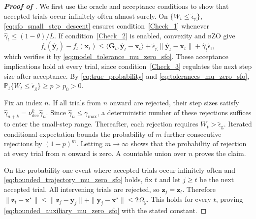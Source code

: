 \documentclass{article}
\begin{document}
\begin{proof}[\textbf{Proof of }]
\label{proof:gc_trajectory}
We first use the oracle and acceptance conditions to show that accepted
trials occur infinitely often almost surely. On
\(\{W_t\le\widetilde\epsilon_{\mathrm{g}}\}\),
\eqref{eq:sfo_small_step_descent} ensures condition~\eqref{Check_1} whenever
\(\hat\gamma_t\le(1-\theta)/L\). If condition~\eqref{Check_2} is
enabled, convexity and \textsc{bZO} give
\begin{equation}\label{eq:sfo_model_comparison}
f_t(\hat {\bm{y}}_t)-f_t(\bm{x}_t)
\le\langle\mathbf{G}_t,\hat {\bm{y}}_t-\bm{x}_t\rangle
+\widetilde\epsilon_{\mathrm{g}}\|\hat {\bm{y}}_t-\bm{x}_t\|
+\hat\gamma_t\widetilde\epsilon_{\mathrm{f}},
\end{equation}
which verifies it by \eqref{eq:model_tolerance_mu_zero_sfo}.
These acceptance implications hold at every trial,
since condition~\eqref{Check_3} regulates the next step size after
acceptance. By \eqref{eq:true_probability} and
\eqref{eq:tolerances_mu_zero_sfo},
\(\mathbb P_t\{W_t\le\widetilde\epsilon_{\mathrm{g}}\}\ge p>p_0>0\).

Fix an index \(n\). If all trials from \(n\) onward are rejected,
their step sizes satisfy
\(\hat\gamma_{n+k}=\nu_{\mathrm{dec}}^k\hat\gamma_n\).
Since \(\hat\gamma_n\le\gamma_{\max}\), a deterministic number of
these rejections suffices to enter the small-step range. Thereafter,
each rejection requires \(W_t>\widetilde\epsilon_{\mathrm{g}}\). Iterated
conditional expectation bounds the probability of \(m\) further
consecutive rejections by \((1-p)^m\). Letting \(m\to\infty\) shows
that the probability of rejection at every trial from \(n\) onward
is zero. A countable union over \(n\) proves the claim.

On the probability-one event where accepted trials occur infinitely
often and \eqref{eq:bounded_trajectory_mu_zero_sfo} holds, fix \(t\) and let
\(j\ge t\) be the next accepted trial. All intervening trials are
rejected, so \(\bm{z}_j=\bm{z}_t\). Therefore
\(\|\bm{z}_t-\bm{x}^\star\|\le\|\bm{z}_j-\bm{y}_j\|+\|\bm{y}_j-\bm{x}^\star\|
\le2\widehat\Omega_y\).
This holds for every \(t\), proving
\eqref{eq:bounded_auxiliary_mu_zero_sfo} with the stated constant.
\end{proof}
\end{document}
